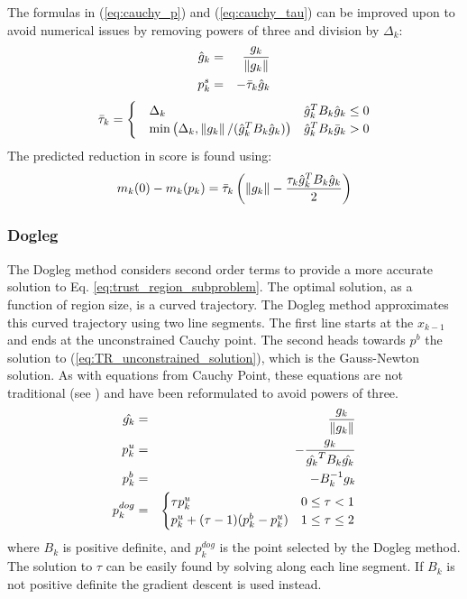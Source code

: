 The formulas in (\ref{eq:cauchy_p}) and (\ref{eq:cauchy_tau}) can be improved upon to avoid numerical issues by removing powers of three and division by $\Delta_k$:
\begin{eqnarray}
\hat{g}_k &=& \frac{g_k}{\left\lVert g_k\right\rVert} \\
p^s_k &=& -\bar{\tau}_k \hat{g}_k
\end{eqnarray}
\begin{equation}
\bar{\tau}_k = \begin{cases}
		\quad \Delta_k & \hat{g}_k^T B_k \hat{g}_k\le 0 \\
		\quad \min\left(\Delta_k,\left\lVert g_k\right\rVert/(\hat{g}_k^T B_k \hat{g}_k)\right) & \hat{g}_k^T B_k \bar{g}_k > 0
	\end{cases}
\end{equation}
The predicted reduction in score is found using:
\begin{equation}
m_k(0)-m_k(p_k) = \bar{\tau}_k \left(\left\lVert g_k\right\rVert - \frac{\tau_k \hat{g}_k^T B_k \hat{g}_k}{2} \right)
\end{equation}


\subsubsection{Dogleg}
\label{section:dogleg}

The Dogleg method considers second order terms to provide a more accurate solution to Eq. \ref{eq:trust_region_subproblem}. The optimal solution, as a function of region size, is a curved trajectory. The Dogleg method approximates this curved trajectory using two line segments. The first line starts at the $x_{k-1}$ and ends at the unconstrained Cauchy point. The second heads towards $p^b$ the solution to (\ref{eq:TR_unconstrained_solution}), which is the Gauss-Newton solution. As with equations from Cauchy Point, these equations are not traditional (see \cite{numopt2006,IMM2004}) and have been reformulated to avoid powers of three.
\begin{eqnarray}
\hat{g_k} &=& \frac{g_k}{\left\lVert g_k\right\rVert} \\
p^u_k &=& -\frac{g_k}{\hat{g_k}^T B_k \hat{g_k}} \\
p^b_k &=& -B^{-1}_k g_k \\
p^{dog}_k &=&
\begin{cases}
	\tau p^u_k & 0 \le \tau < 1 \\
	p^u_k + (\tau -1)(p^b_k-p^u_k) & 1 \le \tau \le 2
\end{cases}
\end{eqnarray}
where $B_k$ is positive definite, and $p^{dog}_k$ is the point selected by the Dogleg method. The solution to $\tau$ can be easily found by solving along each line segment. If $B_k$ is not positive definite the gradient descent is used instead.

